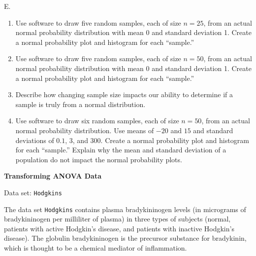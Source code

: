 \documentclass[
]{report}
\newcounter{excount}
\renewcommand{\theexcount}{E\arabic{excount}}
\begin{document}
\begin{list}{\theexcount.}{ \setlength{\itemsep}{1.2em}}
    \begin{enumerate}
      \item Use software to draw five random samples, each of size $n = 25$, from an actual normal probability distribution with mean 0 and standard deviation 1. Create a normal probability plot and histogram for each “sample.”
      \item Use software to draw five random samples, each of size $n = 50$, from an actual normal probability distribution with mean 0 and standard deviation 1. Create a normal probability plot and histogram for each “sample.”
      \item Describe how changing sample size impacts our ability to determine if a sample is truly from a normal distribution.
      \item Use software to draw six random samples, each of size $n = 50$, from an actual normal probability distribution. Use means of $-20$ and $15$ and standard deviations of $0.1$, $3$, and $300$. Create a normal probability plot and histogram for each “sample.” Explain why the mean and standard deviation of a population do not impact the normal probability plots.
    \end{enumerate}

  \item \textbf{Transforming ANOVA Data}

Data set: \texttt{Hodgkins}

The data set \texttt{Hodgkins} contains plasma bradykininogen levels (in micrograms of bradykininogen per milliliter of plasma) in three types of subjects (normal, patients with active Hodgkin’s disease, and patients with inactive Hodgkin’s disease). The globulin bradykininogen is the precursor substance for bradykinin, which is thought to be a chemical mediator of inflammation.


\end{list}
\end{document}
